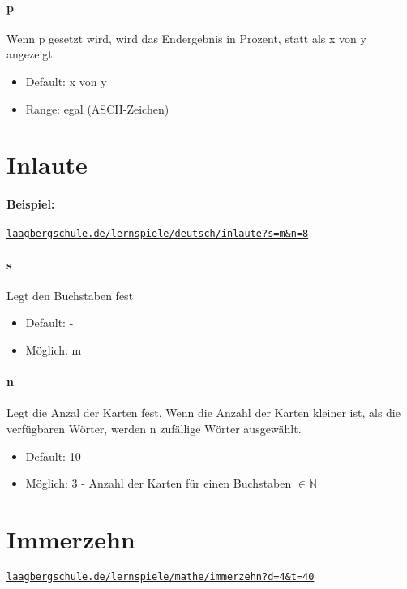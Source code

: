 \documentclass[]{article}
\begin{document}
\begin{multicols}{2}
	\paragraph{p}  Wenn p gesetzt wird, wird das Endergebnis in Prozent, statt als x von y angezeigt.
	\begin{itemize}
		\item Default:  x von y
		\item Range:  egal (ASCII-Zeichen)
	\end{itemize}

	\end{multicols}

\pagebreak
\section{Inlaute}

\paragraph{Beispiel:}
\texttt{\href{laagbergschule.de/lernspiele/deutsch/inlaute?s=m\&n=8}{laagbergschule.de/lernspiele/deutsch/inlaute?s=m\&n=8}} \\
\begin{multicols}{2}

	\paragraph{s}  Legt den Buchstaben fest
	\begin{itemize}
		\item Default: -
		\item Möglich: m
	\end{itemize}
	\bigskip

	\paragraph{n} Legt die Anzal der Karten fest. Wenn die Anzahl der Karten kleiner ist, als die verfügbaren Wörter, werden n zufällige Wörter ausgewählt.
	\begin{itemize}
		\item Default: 10
		\item Möglich: 3 - Anzahl der Karten für einen Buchstaben $\in \mathbb{N}$
	\end{itemize}
\end{multicols}

\section{Immerzehn}
\texttt{\href{laagbergschule.de/lernspiele/mathe/immerzehn?d=4\&t=40}{laagbergschule.de/lernspiele/mathe/immerzehn?d=4\&t=40}} \\
\end{document}

